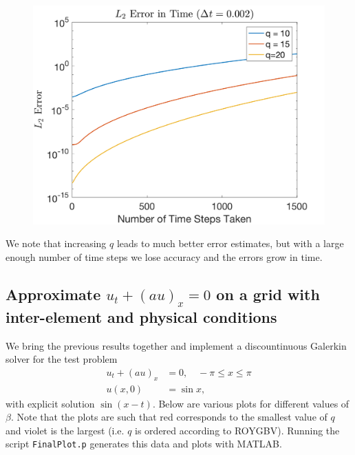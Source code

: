 \documentclass{article}
\begin{document}
\begin{figure}[H]
\begin{minipage}{.4\textwidth}
    \label{fig:medstep}
  \end{minipage}%
  \begin{minipage}{.4\textwidth}
    \centering
    \includegraphics[width=\linewidth]{plots/l2_time_3.png}
    \label{fig:bigstep}
  \end{minipage}%
\end{figure}
\noindent We note that increasing $q$ leads to much better error estimates, but with a large enough number of time steps we lose accuracy and the errors grow in time.

\subsection{Approximate $u_t + \left( a u\right)_x = 0$ on a grid with inter-element and physical conditions}
We bring the previous results together and implement a discountinuous Galerkin solver for the test problem
	\begin{align*}
		u_t + \left( a u\right)_x & = 0, \quad -\pi \leq x \leq \pi \\
		u(x,0) & = \sin x,
	\end{align*}
with explicit solution $\sin (x-t)$. Below are various plots for different values of $\beta$. Note that the plots are such that red corresponds to the smallest value of $q$ and violet is the largest (i.e. $q$ is ordered according to ROYGBV). Running the script \verb|FinalPlot.p| generates this data and plots with MATLAB.
\end{document}

